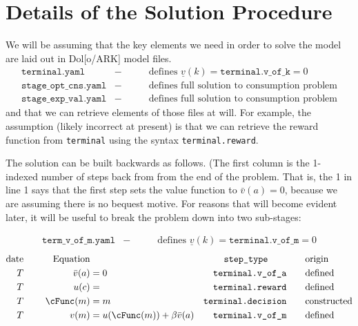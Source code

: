 \documentclass[\econtexRoot/BufferStockTheory]{subfiles}
\newcommand{\EOP}{\bar}
\newcommand{\MOP}{}
\newcommand{\BOP}{\underline}
\begin{document}

\section{Details of the Solution Procedure}\label{sec:ApndxSolutionSteps}

\makeatletter
\newcommand{\leqnomode}{\tagsleft@true}
\newcommand{\reqnomode}{\tagsleft@false}
\renewcommand\tagform@[1]{\maketag@@@{\ignorespaces#1\unskip\@@italiccorr}}
\makeatother
\leqnomode
\small

We will be assuming that the key elements we need in order to solve the model are laid out in Dol[o/ARK] model files.
\begin{align*}
  \texttt{terminal.yaml} & - & \qquad \text{defines }\BOP{v}(k)=\texttt{terminal.v\_of\_k}=0
 \\ \texttt{stage\_opt\_cns.yaml} & - & \qquad \text{defines full solution to consumption problem}
 \\ \texttt{stage\_exp\_val.yaml} & - & \qquad \text{defines full solution to consumption problem}
\end{align*}
and that we can retrieve elements of those files at will.  For example, the assumption (likely incorrect at present) is that we can retrieve the reward function from \texttt{terminal} using the syntax \texttt{terminal.reward}.

\pagebreak
The solution can be built backwards as follows.  (The first column is the 1-indexed number of steps back from from the end of the problem. That is, the 1 in line 1 says that the first step sets the value function to $\EOP{v}(a)=0$, because we are assuming there is no bequest motive.
For reasons that will become evident later, it will be useful to break the problem down into two sub-stages:


\begin{align*}
  \texttt{term\_v\_of\_m.yaml} & - & \qquad \text{defines }\BOP{v}(k)=\texttt{terminal.v\_of\_m}=0
\end{align*}
\begin{alignat}{3}
\text{date} &      &   \notag \text{Equation} & \qquad                       & \qquad \texttt{step\_type} \qquad & \qquad \text{origin}
\\ T        & ~~~~ &   \EOP{v}(a)             & = 0                          & \texttt{terminal.v\_of\_a}        & \qquad \text{defined}
\\ T        & ~~~~ &   u(c)                   & =                            & \texttt{terminal.reward}          & \qquad \text{defined}
\\ T        & ~~~~ &   \cFunc(m)                   & = m                          & \texttt{terminal.decision}        & \qquad \text{constructed} \label{step:cFuncmake}
\\ T        & ~~~~ & \MOP{v}(m)               & = u(\cFunc(m)) + \beta \EOP{v}(a) & \texttt{terminal.v\_of\_m}        & \qquad \text{defined}
\end{alignat}
\end{document}

